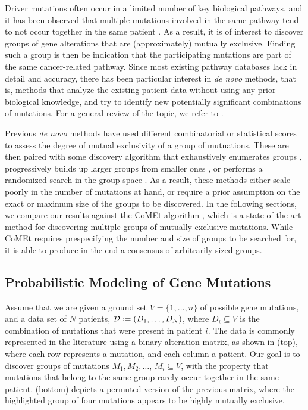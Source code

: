 Driver mutations often occur in a limited number of key biological pathways, and it has been observed that multiple mutations involved in the same pathway tend to not occur together in the same patient \citep{yeang08}.
As a result, it is of interest to discover groups of gene alterations that are (approximately) mutually exclusive.
Finding such a group is then be indication that the participating mutations are part of the same cancer-related pathway.
Since most existing pathway databases lack in detail and accuracy, there has been particular interest in \emph{de novo} methods, that is, methods that analyze the existing patient data without using any prior biological knowledge, and try to identify new potentially significant combinations of mutations.
For a general review of the topic, we refer to \cite{raphael14}.

Previous \emph{de novo} methods have used different combinatorial or statistical scores to assess the degree of mutual exclusivity of a group of mutuations.
These are then paired with some discovery algorithm that exhaustively enumerates groups \citep{muex,yeang08}, progressively builds up larger groups from smaller ones \citep{mutex,rme,memo,timex}, or performs a randomized search in the group space \citep{dendrix,multidendrix,comet}.
As a result, these methods either scale poorly in the number of mutations at hand, or require a prior assumption on the exact or maximum size of the groups to be discovered.
In the following sections, we compare our results against the CoMEt algorithm \citep{comet}, which is a state-of-the-art method for discovering multiple groups of mutually exclusive mutations.
While CoMEt requires prespecifying the number and size of groups to be searched for, it is able to produce in the end a consensus of arbitrarily sized groups.

\subsection{Probabilistic Modeling of Gene Mutations}
Assume that we are given a ground set $V = \{1,\ldots,n\}$ of possible gene mutations, and a data set of $N$ patients, $\mathcal{D} \vcentcolon= (D_1,\ldots,D_N)$, where $D_i \subseteq V$ is the combination of mutations that were present in patient $i$.
The data is commonly represented in the literature using a binary alteration matrix, as shown in  (top), where each row represents a mutation, and each column a patient.
Our goal is to discover groups of mutations $M_1, M_2, \ldots$, $M_i \subseteq V$, with the property that mutations that belong to the same group rarely occur together in the same patient.
 (bottom) depicts a permuted version of the previous matrix, where the highlighted group of four mutations appears to be highly mutually exclusive.

